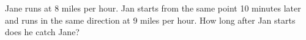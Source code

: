 Jane runs at 8 miles per hour. Jan starts from the same point 10 minutes later and runs in the same direction at 9 miles per hour. How long after Jan starts does he catch Jane?
